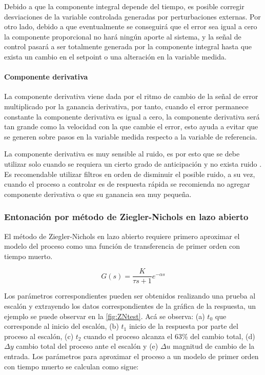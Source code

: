				Debido a que la componente integral depende del tiempo, es posible corregir desviaciones de la variable controlada generadas por perturbaciones externas. Por otro lado, debido a que eventualmente se conseguirá que el error sea igual a cero la componente proporcional no hará ningún aporte al sistema, y la señal de control pasará a ser totalmente generada por la componente integral hasta que exista un cambio en el setpoint o una alteración en la variable medida.

			\paragraph{Componente derivativa}

				La componente derivativa viene dada por el ritmo de cambio de la señal de error multiplicado por la ganancia derivativa, por tanto, cuando el error permanece constante la componente derivativa es igual a cero, la componente derivativa será tan grande como la velocidad con la que cambie el error, esto ayuda a evitar que se generen sobre pasos en la variable medida respecto a la variable de referencia.
				
				La componente derivativa es muy sensible al ruido, es por esto que se debe utilizar solo cuando se requiera un cierto grado de anticipación y no exista ruido \Parencite{smith1985principles}. Es recomendable utilizar filtros en orden de disminuir el posible ruido, a su vez, cuando el proceso a controlar es de respuesta rápida se recomienda no agregar componente derivativa o que su ganancia sea muy pequeña.
				
		\subsubsection{Entonación por método de Ziegler-Nichols en lazo abierto}
			
			El método de Ziegler-Nichols en lazo abierto requiere primero aproximar el modelo del proceso como una función de transferencia de primer orden con tiempo muerto.
			
			\begin{equation}\label{eq:firstorderProcess}
				G(s) = \frac{K}{\tau s + 1} e^{-\alpha s}
			\end{equation}
			
			Los parámetros correspondientes pueden ser obtenidos realizando una prueba al escalón y extrayendo los datos correspondientes de la gráfica de la respuesta, un ejemplo se puede observar en la \cref{fig:ZNtest}. Acá se observa: (a) $t_{0}$ que corresponde al inicio del escalón, (b) $t_{1}$ inicio de la respuesta por parte del proceso al escalón, (c) $t_{2}$ cuando el proceso alcanza el 63\% del cambio total, (d) $\Delta y$ cambio total del proceso ante el escalón y (e) $\Delta u$ magnitud de cambio de la entrada. Los parámetros para aproximar el proceso a un modelo de primer orden con tiempo muerto se calculan como sigue:
			
